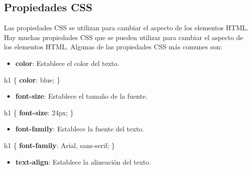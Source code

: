 \documentclass[
  a4paper,
  DIV=11,
  numbers=noendperiod,
  onepage,
  openany]{scrreprt}
\newenvironment{Shaded}{\begin{snugshade}}{\end{snugshade}}
\newcommand{\CharTok}[1]{\textcolor[rgb]{0.13,0.47,0.30}{#1}}
\newcommand{\ConstantTok}[1]{\textcolor[rgb]{0.56,0.35,0.01}{#1}}
\newcommand{\DataTypeTok}[1]{\textcolor[rgb]{0.68,0.00,0.00}{#1}}
\newcommand{\DecValTok}[1]{\textcolor[rgb]{0.68,0.00,0.00}{#1}}
\newcommand{\KeywordTok}[1]{\textcolor[rgb]{0.00,0.23,0.31}{\textbf{#1}}}
\newcommand{\NormalTok}[1]{\textcolor[rgb]{0.00,0.23,0.31}{#1}}
\newcommand{\OperatorTok}[1]{\textcolor[rgb]{0.37,0.37,0.37}{#1}}
\providecommand{\tightlist}{%
  \setlength{\itemsep}{0pt}\setlength{\parskip}{0pt}}\usepackage{longtable,booktabs,array}
\begin{document}
\begin{tcolorbox}
\section{Propiedades CSS}\label{propiedades-css}

Las propiedades CSS se utilizan para cambiar el aspecto de los elementos
HTML. Hay muchas propiedades CSS que se pueden utilizar para cambiar el
aspecto de los elementos HTML. Algunas de las propiedades CSS más
comunes son:

\begin{itemize}
\tightlist
\item
  \textbf{color}: Establece el color del texto.
\end{itemize}

\begin{Shaded}
\begin{Highlighting}[]
\NormalTok{h1 \{}
  \KeywordTok{color}\CharTok{:} \ConstantTok{blue}\OperatorTok{;}
\NormalTok{\}}
\end{Highlighting}
\end{Shaded}

\begin{itemize}
\tightlist
\item
  \textbf{font-size}: Establece el tamaño de la fuente.
\end{itemize}

\begin{Shaded}
\begin{Highlighting}[]
\NormalTok{h1 \{}
  \KeywordTok{font{-}size}\CharTok{:} \DecValTok{24}\DataTypeTok{px}\OperatorTok{;}
\NormalTok{\}}
\end{Highlighting}
\end{Shaded}

\begin{itemize}
\tightlist
\item
  \textbf{font-family}: Establece la fuente del texto.
\end{itemize}

\begin{Shaded}
\begin{Highlighting}[]
\NormalTok{h1 \{}
  \KeywordTok{font{-}family}\CharTok{:} \DecValTok{Arial}\OperatorTok{,} \DecValTok{sans{-}serif}\OperatorTok{;}
\NormalTok{\}}
\end{Highlighting}
\end{Shaded}

\begin{itemize}
\tightlist
\item
  \textbf{text-align}: Establece la alineación del texto.
\end{itemize}


\end{tcolorbox}
\end{document}
